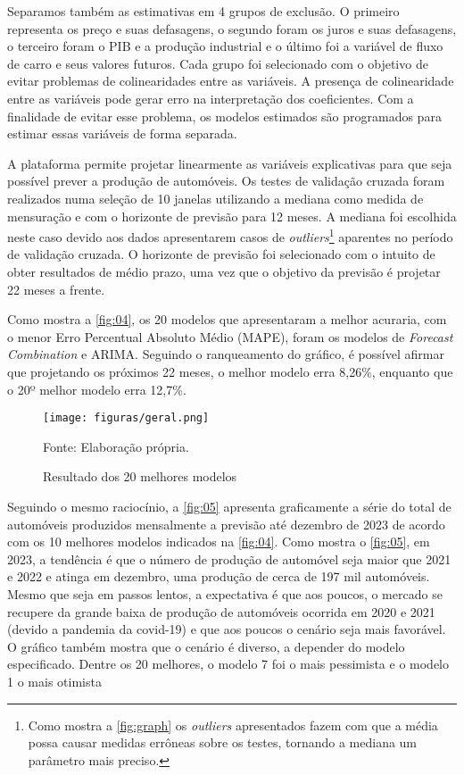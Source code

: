 \documentclass[
article, %
12pt, %
oneside, %
a4paper, %
portuguese, %
portuguese %
]{abntex2}
\begin{document}
Separamos também as estimativas em 4 grupos de exclusão. O primeiro representa os preço e suas defasagens, o segundo foram os juros e suas defasagens, o terceiro foram o PIB e a produção industrial e o último foi a variável de fluxo de carro e seus valores futuros. Cada grupo foi selecionado com o objetivo de evitar problemas de colinearidades entre as variáveis. A presença de colinearidade entre as variáveis pode gerar erro na interpretação dos coeficientes. Com a finalidade de evitar esse problema, os modelos estimados são programados para estimar essas variáveis de forma separada.

A plataforma permite projetar linearmente as variáveis explicativas para que seja possível prever a produção de automóveis. Os testes de validação cruzada foram realizados numa seleção de 10 janelas utilizando a mediana como medida de mensuração e com o horizonte de previsão para 12 meses. A mediana foi escolhida neste caso devido aos dados apresentarem casos de \textit{outliers}\footnote{Como mostra a \autoref{fig:graph} os \textit{outliers} apresentados fazem com que a média possa causar medidas errôneas sobre os testes, tornando a mediana um parâmetro mais preciso.} aparentes no período de validação cruzada. O horizonte de previsão foi selecionado com o intuito de obter resultados de médio prazo, uma vez que o objetivo da previsão é projetar 22 meses a frente.

Como mostra a \autoref{fig:04}, os 20 modelos que apresentaram a melhor acuraria, com o menor Erro Percentual Absoluto Médio (MAPE), foram os modelos de \textit{Forecast Combination} e ARIMA. Seguindo o ranqueamento do gráfico, é possível afirmar que projetando os próximos 22 meses, o melhor modelo erra 8,26\%, enquanto que o 20º melhor modelo erra 12,7\%.

\begin{figure}[H]
    \centering
    \caption{Resultado dos 20 melhores modelos}
    \texttt{[image: figuras/geral.png]}
    \begin{flushleft}
    Fonte: Elaboração própria.
    \end{flushleft}
    \label{fig:04}
\end{figure}

Seguindo o mesmo raciocínio, a \autoref{fig:05} apresenta graficamente a série do total de automóveis produzidos mensalmente a previsão até dezembro de 2023 de acordo com os 10 melhores modelos indicados na \autoref{fig:04}. Como mostra o \autoref{fig:05}, em 2023, a tendência é que o número de produção de automóvel seja maior que 2021 e 2022 e atinga em dezembro, uma produção de cerca de 197 mil automóveis. Mesmo que seja em passos lentos, a expectativa é que aos poucos, o mercado se recupere da grande baixa de produção de automóveis ocorrida em 2020 e 2021 (devido a pandemia da covid-19) e que aos poucos o cenário seja mais favorável. O gráfico também mostra que o cenário é diverso, a depender do modelo especificado. Dentre os 20 melhores, o modelo 7 foi o mais pessimista e o modelo 1 o mais otimista
\end{document}
